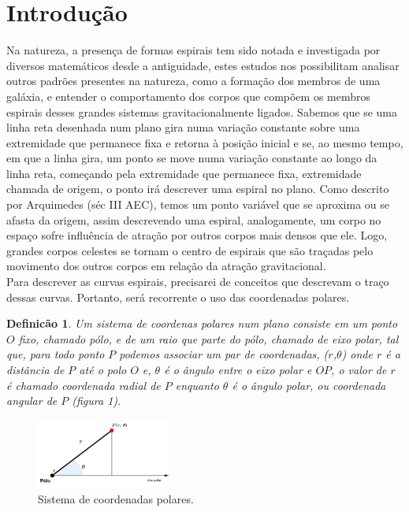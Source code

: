 \documentclass[twoside,a4paper,10pt]{article}
\newtheorem{mydef}{Definicão}[section]
\begin{document}
\newpage



\section{Introdução}

Na natureza, a presença de formas espirais tem sido notada e investigada por diversos matemáticos desde a antiguidade, estes estudos nos possibilitam analisar outros padrões presentes na natureza, como a formação dos membros de uma galáxia, e entender o comportamento dos corpos que compõem os membros espirais desses grandes sistemas gravitacionalmente ligados.
Sabemos que se uma linha reta desenhada num plano gira numa variação constante sobre uma extremidade que permanece fixa e retorna à posição inicial e se, ao mesmo tempo, em que a linha gira, um ponto se move numa variação constante ao longo da linha reta, começando pela extremidade que permanece fixa, extremidade chamada de origem, o ponto irá descrever uma espiral no plano. \linebreak[4] Como descrito por Arquimedes (séc III AEC), temos um ponto variável que se aproxima ou se afasta da origem, assim descrevendo uma espiral, analogamente, um corpo no espaço sofre influência de atração por outros corpos mais densos que ele. Logo, grandes corpos celestes se tornam o centro de espirais que são traçadas pelo movimento dos outros corpos em relação da atração gravitacional.\\ Para descrever as curvas espirais, precisarei de conceitos que descrevam o traço dessas curvas. Portanto, será recorrente o uso das coordenadas polares. 

\begin{mydef} 
	Um sistema de coordenas polares num plano consiste em um ponto $O$ fixo, chamado pólo, e de um raio que parte do pólo, chamado de eixo polar, tal que, para todo ponto $P$ podemos associar um par de coordenadas, ($r$,$\theta$) onde $r$ é a distância de $P$ até o polo $O$ e, $\theta$ é o ângulo entre o eixo polar e $OP$, o valor de $r$ é chamado coordenada radial de $P$ enquanto $\theta$ é o ângulo polar, ou coordenada angular de $P$ (figura 1).
\end{mydef} 

\begin{figure}[h!]
	\includegraphics[width=0.4\textwidth]{polar}
	\caption{Sistema de coordenadas polares.}
\end{figure}
\end{document}

